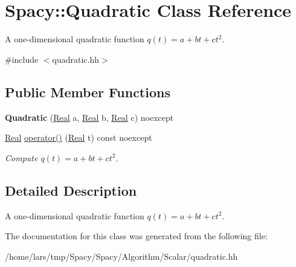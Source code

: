 \hypertarget{classSpacy_1_1Quadratic}{}\section{Spacy\+:\+:Quadratic Class Reference}
\label{classSpacy_1_1Quadratic}


A one-\/dimensional quadratic function $q(t) = a + bt + ct^2$.  




{\ttfamily \#include $<$quadratic.\+hh$>$}

\subsection*{Public Member Functions}
\begin{DoxyCompactItemize}
\item 
{\bfseries Quadratic} (\hyperlink{classSpacy_1_1Real}{Real} a, \hyperlink{classSpacy_1_1Real}{Real} b, \hyperlink{classSpacy_1_1Real}{Real} c) noexcept\hypertarget{classSpacy_1_1Quadratic_a95858d6af14cbe5f902437107494c3c3}{}\label{classSpacy_1_1Quadratic_a95858d6af14cbe5f902437107494c3c3}

\item 
\hyperlink{classSpacy_1_1Real}{Real} \hyperlink{classSpacy_1_1Quadratic_a4535530da8109aa29a5ca701c3fb0710}{operator()} (\hyperlink{classSpacy_1_1Real}{Real} t) const noexcept\hypertarget{classSpacy_1_1Quadratic_a4535530da8109aa29a5ca701c3fb0710}{}\label{classSpacy_1_1Quadratic_a4535530da8109aa29a5ca701c3fb0710}

\begin{DoxyCompactList}\small\item\em Compute $q(t) = a + bt + ct^2 $. \end{DoxyCompactList}\end{DoxyCompactItemize}


\subsection{Detailed Description}
A one-\/dimensional quadratic function $q(t) = a + bt + ct^2$. 

The documentation for this class was generated from the following file\+:\begin{DoxyCompactItemize}
\item 
/home/lars/tmp/\+Spacy/\+Spacy/\+Algorithm/\+Scalar/quadratic.\+hh\end{DoxyCompactItemize}
